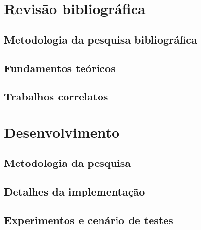 \documentclass[
    12pt,                %
    openright,           %
    oneside,             %
    a4paper,             %
    english,             %
    brazil               %
]{abntex2}
\begin{document}
\chapter{Revisão bibliográfica}
\label{cap:revisao}

\section{Metodologia da pesquisa bibliográfica}
\label{sec:metodologia_pesquisa_bib}


\section{Fundamentos teóricos}
\label{sec:fundamentos}


\section{Trabalhos correlatos}
\label{sec:trabalhos_correlatos}


\chapter{Desenvolvimento}
\label{cap:desenvolvimento}

\section{Metodologia da pesquisa}
\label{sec:metodologia_pesquisa}


\section{Detalhes da implementação}
\label{sec:implementacao}





\section{Experimentos e cenário de testes}
\label{sec:experimentos}

\end{document}
